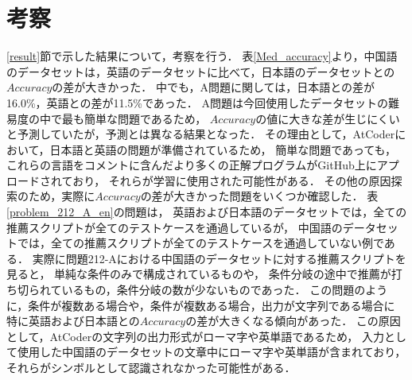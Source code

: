 \section{考察\label{consideration}}
  \ref{result}節で示した結果について，考察を行う．
  表\ref{Med_accuracy}より，中国語のデータセットは，英語のデータセットに比べて，日本語のデータセットとの$Accuracy$の差が大きかった．
  中でも，A問題に関しては，日本語との差が16.0\%，英語との差が11.5\%であった．
  A問題は今回使用したデータセットの難易度の中で最も簡単な問題であるため，
  $Accuracy$の値に大きな差が生じにくいと予測していたが，予測とは異なる結果となった．
  その理由として，AtCoder\cite{AtCoder}において，日本語と英語の問題が準備されているため，
  簡単な問題であっても，これらの言語をコメントに含んだより多くの正解プログラムがGitHub上にアプロードされており，
  それらが学習に使用された可能性がある．
  その他の原因探索のため，実際に$Accuracy$の差が大きかった問題をいくつか確認した．
  表\ref{problem_212_A_en}の問題は，
  英語および日本語のデータセットでは，全ての推薦スクリプトが全てのテストケースを通過しているが，
  中国語のデータセットでは，全ての推薦スクリプトが全てのテストケースを通過していない例である．
  実際に問題212-Aにおける中国語のデータセットに対する推薦スクリプトを見ると，
  単純な条件のみで構成されているものや，
  条件分岐の途中で推薦が打ち切られているもの，条件分岐の数が少ないものであった．
  この問題のように，条件が複数ある場合や，条件が複数ある場合，出力が文字列である場合に
  特に英語および日本語との$Accuracy$の差が大きくなる傾向があった．
  この原因として，AtCoderの文字列の出力形式がローマ字や英単語であるため，
  入力として使用した中国語のデータセットの文章中にローマ字や英単語が含まれており，
  それらがシンボルとして認識されなかった可能性がある．
